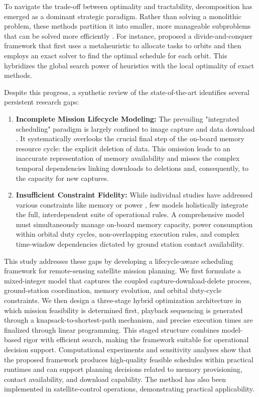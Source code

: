 \documentclass[preprint,3p,12pt,authoryear]{elsarticle}
\begin{document}
To navigate the trade-off between optimality and tractability, decomposition has emerged as a dominant strategic paradigm. Rather than solving a monolithic problem, these methods partition it into smaller, more manageable subproblems that can be solved more efficiently \citep{Boerkoel2021}. For instance, \citet{Wu2022} proposed a divide-and-conquer framework that first uses a metaheuristic to allocate tasks to orbits and then employs an exact solver to find the optimal schedule for each orbit. This hybridizes the global search power of heuristics with the local optimality of exact methods.

Despite this progress, a synthetic review of the state-of-the-art identifies several persistent research gaps:
\begin{enumerate}
    \item \textbf{Incomplete Mission Lifecycle Modeling:} The prevailing "integrated scheduling" paradigm is largely confined to image capture and data download \citep{Bianchessi2008,Hu2019}. It systematically overlooks the crucial final step of the on-board memory resource cycle: the explicit deletion of data. This omission leads to an inaccurate representation of memory availability and misses the complex temporal dependencies linking downloads to deletions and, consequently, to the capacity for new captures.
    \item \textbf{Insufficient Constraint Fidelity:} While individual studies have addressed various constraints like memory \citep{Wang2011} or power \citep{Lin2005}, few models holistically integrate the full, interdependent suite of operational rules. A comprehensive model must simultaneously manage on-board memory capacity, power consumption within orbital duty cycles, non-overlapping execution rules, and complex time-window dependencies dictated by ground station contact availability.
\end{enumerate}

This study addresses these gaps by developing a lifecycle-aware scheduling framework for remote-sensing satellite mission planning. We first formulate a mixed-integer model that captures the coupled capture-download-delete process, ground-station coordination, memory evolution, and orbital duty-cycle constraints. We then design a three-stage hybrid optimization architecture in which mission feasibility is determined first, playback sequencing is generated through a knapsack-to-shortest-path mechanism, and precise execution times are finalized through linear programming. This staged structure combines model-based rigor with efficient search, making the framework suitable for operational decision support. Computational experiments and sensitivity analyses show that the proposed framework produces high-quality feasible schedules within practical runtimes and can support planning decisions related to memory provisioning, contact availability, and download capability. The method has also been implemented in satellite-control operations, demonstrating practical applicability.
\end{document}
